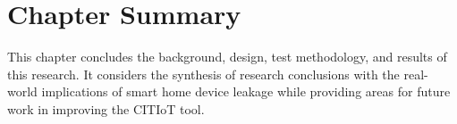 \documentclass[12pt,letterpaper,oneside]{book}
\begin{document}
		\section{Chapter Summary}
		This chapter concludes the background, design, test methodology, and results of this research. It considers the synthesis of research conclusions with the real-world implications of smart home device leakage while providing areas for future work in improving the \ac{CITIoT} tool.
		
		
	\todos
\backmatter
	\singlespace
	
	 
	\clearpage
\end{document}
